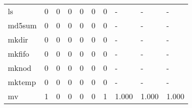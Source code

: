 \begin{longtable}{lp{1.3cm}p{1.3cm}p{1.3cm}p{1.3cm}p{1.3cm}p{1.3cm}p{1.3cm}p{1.3cm}p{1.3cm}}
ls        &                      0 &                                             0 &                                            0 &                                           0 &                                            0 &                                          0 &                                    - &                                      - &                                    - \\
md5sum    &                      0 &                                             0 &                                            0 &                                           0 &                                            0 &                                          0 &                                    - &                                      - &                                    - \\
mkdir     &                      0 &                                             0 &                                            0 &                                           0 &                                            0 &                                          0 &                                    - &                                      - &                                    - \\
mkfifo    &                      0 &                                             0 &                                            0 &                                           0 &                                            0 &                                          0 &                                    - &                                      - &                                    - \\
mknod     &                      0 &                                             0 &                                            0 &                                           0 &                                            0 &                                          0 &                                    - &                                      - &                                    - \\
mktemp    &                      0 &                                             0 &                                            0 &                                           0 &                                            0 &                                          0 &                                    - &                                      - &                                    - \\
mv        &                      1 &                                             0 &                                            0 &                                           0 &                                            0 &                                          1 &                                1.000 &                                  1.000 &                                1.000 \\

\end{longtable}
